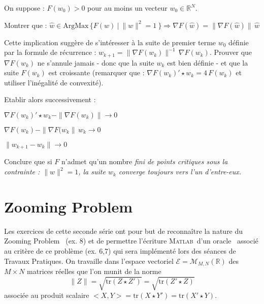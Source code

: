\documentclass[12pt,a4paper,fleqn]{report}
\newcommand{\matlab}{\textsc{Matlab}}
\newcommand{\R}{\mathbb R}
\newcommand{\grad}{\nabla}
\newcommand{\on}{\begin{displaymath}}
\newcommand{\off}{\end{displaymath}}
\begin{document}
\begin{exercice}
On suppose : $F(w_0)>0$ pour au moins un vecteur $w_0\in\R^N$.
\begin{questions}
\item  Montrer que : \mbox{$\hat w \in \mathrm{ArgMax}\,\{ F(w)\ | \ \|w\|^2=1\ \} \Rightarrow \grad F(\hat w) = \| \grad F(\hat w) \|\,\hat w$} 
\item Cette implication suggère de s'intéresser à la suite de premier terme $w_0$ définie par la formule de récurrence : 
\mbox{$ w_{k+1}= \| \grad F(w_k) \| ^{-1}  \, \grad F(w_k)$}. Prouver que
 $\grad F(w_k)$ ne s'annule jamais - donc que la suite $w_k$ est bien définie - et que la suite $F(w_k)$ est croissante (remarquer que : $\grad F(w_k)'\star w_k= 4\,F(w_k)$ et utiliser l'inégalité de convexité).
\item Etablir alors successivement :
\begin{subquestions}
\item $\grad F(w_k)'\star w_k-\| \grad F(w_k)\| \rightarrow 0$
\item $\grad F(w_k)-\|\grad F(w_k\|\,w_k \rightarrow 0$
\item $\|w_{k+1}-w_k\|\rightarrow 0$
\end{subquestions}
\item Conclure que si $F$ n'admet qu'un nombre \it fini \rm de points critiques sous la contrainte : $\|w\|^2=1$, la suite $w_k$ converge toujours vers l'un d'entre-eux.
\end{questions}

\end{exercice}



\section{Zooming Problem}

Les exercices de cette seconde s\'erie ont pour but de reconnaître la nature du \og Zooming Problem \fg\ (ex. 8) et de permettre l'\'ecriture \matlab\ d'un \og oracle \fg\ associ\'e au crit\`ere de ce probl\`eme (ex. 6,7) qui sera impl\'ement\'e lors des s\'eances de Travaux Pratiques. On travaille dans l'espace vectoriel $\mathcal E=\mathcal M_{M,N}(\R)$ des $M\times N$ matrices r\'eelles que l'on munit de la norme 
\on \|Z\|=\sqrt{\mathrm{tr}(Z\star Z')}=\sqrt{\mathrm{tr}(Z'\star Z)}\off 
associ\'ee au produit scalaire $<X,Y>=\mathrm{tr}(X\star Y')=\mathrm{tr}(X'\star Y)$.
 
\end{document}
